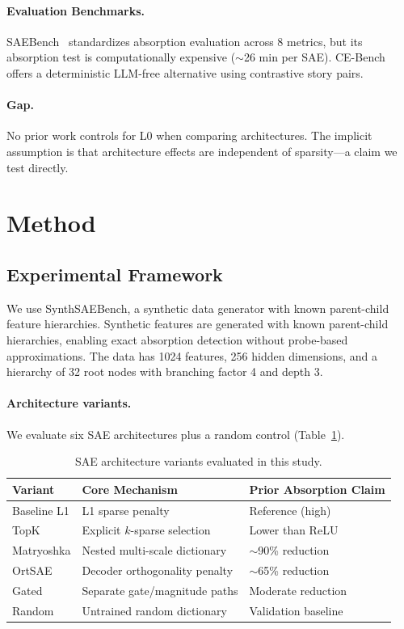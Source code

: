\documentclass{article}
\begin{document}
\paragraph{Evaluation Benchmarks.} SAEBench~\citep{karvonen2025saebench} standardizes absorption evaluation across 8 metrics, but its absorption test is computationally expensive ($\sim$26 min per SAE). CE-Bench~\citep{peng2025cebench} offers a deterministic LLM-free alternative using contrastive story pairs.

\paragraph{Gap.} No prior work controls for L0 when comparing architectures. The implicit assumption is that architecture effects are independent of sparsity---a claim we test directly.

\section{Method}

\subsection{Experimental Framework}

We use SynthSAEBench, a synthetic data generator with known parent-child feature hierarchies. Synthetic features are generated with known parent-child hierarchies, enabling exact absorption detection without probe-based approximations. The data has 1024 features, 256 hidden dimensions, and a hierarchy of 32 root nodes with branching factor 4 and depth 3.

\paragraph{Architecture variants.} We evaluate six SAE architectures plus a random control (Table~\ref{tab:variants}).

\begin{table}[h]
\caption{SAE architecture variants evaluated in this study.}
\label{tab:variants}
\centering
\begin{tabular}{lll}
\toprule
Variant & Core Mechanism & Prior Absorption Claim \\
\midrule
Baseline L1 & L1 sparse penalty & Reference (high) \\
TopK & Explicit $k$-sparse selection & Lower than ReLU~\citep{karvonen2025saebench} \\
Matryoshka & Nested multi-scale dictionary & $\sim$90\% reduction~\citep{bussmann2025matryoshka} \\
OrtSAE & Decoder orthogonality penalty & $\sim$65\% reduction~\citep{anonymous2025ortsae} \\
Gated & Separate gate/magnitude paths & Moderate reduction~\citep{anonymous2024gated} \\
Random & Untrained random dictionary & Validation baseline \\
\bottomrule
\end{tabular}
\end{table}
\end{document}
